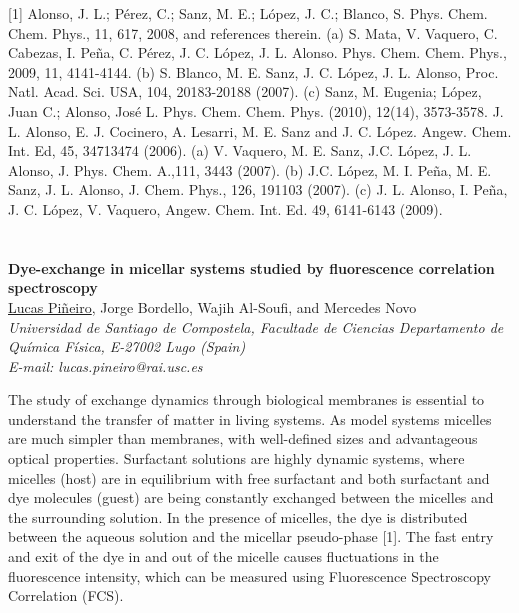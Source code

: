 {\footnotesize
[1] Alonso, J. L.; Pérez, C.; Sanz, M. E.; López, J. C.; Blanco, S. Phys. Chem. Chem. Phys., 11, 617,
2008, and references therein.
\newline
[2] (a) S. Mata, V. Vaquero, C. Cabezas, I. Peña, C. Pérez, J. C. López, J. L. Alonso. Phys. Chem.
Chem. Phys., 2009, 11, 4141-4144. (b) S. Blanco, M. E. Sanz, J. C. López, J. L. Alonso, Proc. Natl.
Acad. Sci. USA, 104, 20183-20188 (2007). (c) Sanz, M. Eugenia; López, Juan C.; Alonso, José L.
Phys. Chem. Chem. Phys. (2010), 12(14), 3573-3578.
\newline
[3] J. L. Alonso, E. J. Cocinero, A. Lesarri, M. E. Sanz and J.  C. López. Angew. Chem. Int. Ed, 45, 34713474 (2006).
\newline
[4] (a) V. Vaquero, M. E. Sanz, J.C. López, J. L. Alonso, J. Phys. Chem. A.,111, 3443 (2007). (b) J.C.
López, M. I. Peña, M. E. Sanz, J. L. Alonso, J. Chem. Phys., 126, 191103 (2007). (c) J. L. Alonso, I. Peña,
J. C. López, V. Vaquero, Angew. Chem. Int. Ed. 49, 6141-6143 (2009).
}

\newpage
\setcounter{figure}{0}
\section*{}
\begin{center}
{\bf \Large
Dye-exchange in micellar systems studied
by fluorescence correlation spectroscopy
}
\\
\vspace{0.5cm}
\underline{Lucas Piñeiro}, Jorge Bordello, Wajih Al-Soufi, and Mercedes Novo
\\
\vspace{0.5cm}
{\it
Universidad de Santiago de Compostela, Facultade de Ciencias
Departamento de Química Física, E-27002 Lugo (Spain)
}
\\
\vspace{0.5cm}
{\it E-mail: lucas.pineiro@rai.usc.es}
\vspace{0.5cm}
\end{center}
The study of exchange dynamics through biological membranes is essential
to understand the transfer of matter in living systems. As model systems micelles are
much simpler than membranes, with well-defined sizes and advantageous optical
properties. Surfactant solutions are highly dynamic systems, where micelles (host)
are in equilibrium with free surfactant and both surfactant and dye molecules (guest)
are being constantly exchanged between the micelles and the surrounding solution.
In the presence of micelles, the dye is distributed between the aqueous solution and
the micellar pseudo-phase [1]. The fast entry and exit of the dye in and out of the
micelle causes fluctuations in the fluorescence intensity, which can be measured
using Fluorescence Spectroscopy Correlation (FCS).

